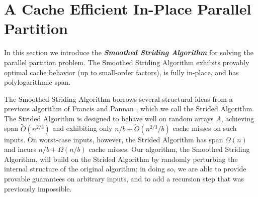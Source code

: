 \documentclass[11pt]{article}
\newcommand{\defn}[1]{{\textit{\textbf{\boldmath #1}}} }
\renewcommand{\paragraph}[1]{\vspace{0.09in}\noindent{\bf \boldmath #1.}}
\theoremstyle{remark}
\theoremstyle{remark}
\begin{document}
\section{A Cache Efficient In-Place Parallel Partition}\label{sec:smoothing}
In this section we introduce the \defn{Smoothed Striding Algorithm} for solving
the parallel partition problem. The Smoothed Striding Algorithm exhibits
provably optimal cache behavior (up to small-order factors), is fully in-place,
and has polylogarithmic span.


\paragraph{The Strided Algorithm \cite{FrancisPa92}}
The Smoothed Striding Algorithm borrows several structural ideas from a
previous algorithm of Francis and Pannan \cite{FrancisPa92}, which we call the
Strided Algorithm. The Strided Algorithm is designed to behave well on random
arrays $A$, achieving span $\tilde{O}(n^{2/3})$ and exhibiting only $n/b +
\tilde{O}(n^{2/3} / b)$  cache misses on such inputs. On worst-case inputs,
however, the Strided Algorithm has span $\Omega(n)$ and incurs $n/b +
\Omega(n/b)$ cache misses. Our algorithm, the Smoothed Striding Algorithm, will
build on the Strided Algorithm by randomly perturbing the internal structure of
the original algorithm; in doing so, we are able to provide provable guarantees
on arbitrary inputs, and to add a recursion step that was previously
impossible.
\end{document}
